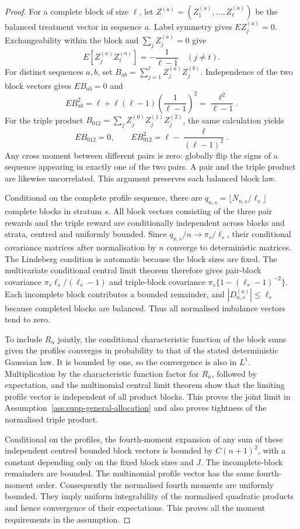 \documentclass[12pt,a4paper]{article}
\theoremstyle{definition}
\theoremstyle{remark}\newtheorem{remark}{Remark}
\numberwithin{equation}{section}
\begin{document}
\begin{proof}
For a complete block of size $\ell$, let $Z^{(a)}=(Z_1^{(a)},\ldots,Z_\ell^{(a)})$ be the balanced treatment vector in sequence $a$. Label symmetry gives $E Z_j^{(a)}=0$. Exchangeability within the block and $\sum_jZ_j^{(a)}=0$ give
\[
 E[Z_j^{(a)}Z_t^{(a)}]=-\frac1{\ell-1}\quad(j\ne t).
\]
For distinct sequences $a,b$, set $B_{ab}=\sum_{j=1}^\ell Z_j^{(a)}Z_j^{(b)}$. Independence of the two block vectors gives $E B_{ab}=0$ and
\begin{equation}\label{eq:supp-block-pair-variance}
 E B_{ab}^2=\ell+\ell(\ell-1)\left(\frac1{\ell-1}\right)^2
             =\frac{\ell^2}{\ell-1}.
\end{equation}
For the triple product $B_{012}=\sum_jZ_j^{(0)}Z_j^{(1)}Z_j^{(2)}$, the same calculation yields
\[
 E B_{012}=0,\qquad E B_{012}^2=\ell-\frac{\ell}{(\ell-1)^2}.
\]
Any cross moment between different pairs is zero: globally flip the signs of a sequence appearing in exactly one of the two pairs. A pair and the triple product are likewise uncorrelated. This argument preserves each balanced block law.

Conditional on the complete profile sequence, there are $q_{n,s}=\lfloor N_{n,s}/\ell_s\rfloor$ complete blocks in stratum $s$. All block vectors consisting of the three pair rewards and the triple reward are conditionally independent across blocks and strata, centred and uniformly bounded. Since $q_{n,s}/n\to\pi_s/\ell_s$, their conditional covariance matrices after normalisation by $n$ converge to deterministic matrices. The Lindeberg condition is automatic because the block sizes are fixed. The multivariate conditional central limit theorem therefore gives pair-block covariance $\pi_s\ell_s/(\ell_s-1)$ and triple-block covariance $\pi_s\{1-(\ell_s-1)^{-2}\}$. Each incomplete block contributes a bounded remainder, and $|D_{n,s}^{(a)}|\le\ell_s$ because completed blocks are balanced. Thus all normalised imbalance vectors tend to zero.

To include $R_n$ jointly, the conditional characteristic function of the block sums given the profiles converges in probability to that of the stated deterministic Gaussian law. It is bounded by one, so the convergence is also in $L^1$. Multiplication by the characteristic function factor for $R_n$, followed by expectation, and the multinomial central limit theorem show that the limiting profile vector is independent of all product blocks. This proves the joint limit in Assumption~\ref{ass:supp-general-allocation} and also proves tightness of the normalised triple product.

Conditional on the profiles, the fourth-moment expansion of any sum of these independent centred bounded block vectors is bounded by $C(n+1)^2$, with a constant depending only on the fixed block sizes and $J$. The incomplete-block remainders are bounded. The multinomial profile vector has the same fourth-moment order. Consequently the normalised fourth moments are uniformly bounded. They imply uniform integrability of the normalised quadratic products and hence convergence of their expectations. This proves all the moment requirements in the assumption.
\end{proof}
\end{document}
